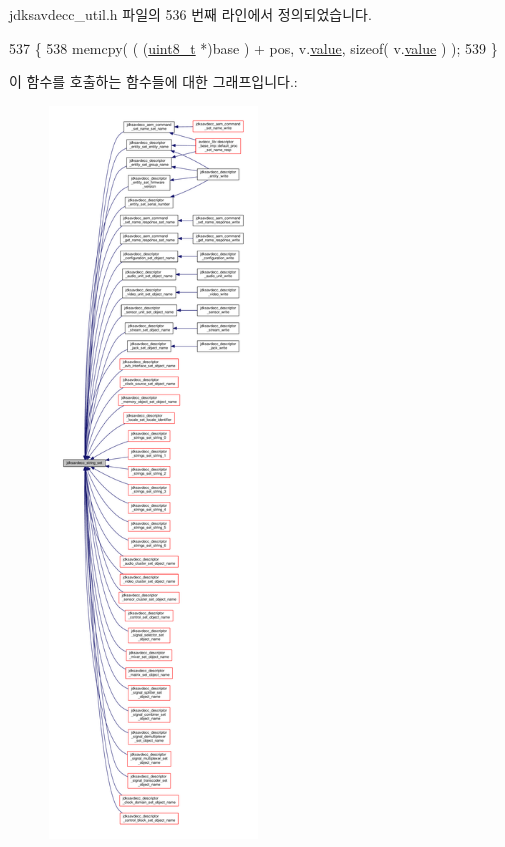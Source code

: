 jdksavdecc\+\_\+util.\+h 파일의 536 번째 라인에서 정의되었습니다.


\begin{DoxyCode}
537 \{
538     memcpy( ( (\hyperlink{stdint_8h_aba7bc1797add20fe3efdf37ced1182c5}{uint8\_t} *)base ) + pos, v.\hyperlink{structjdksavdecc__string_a7968db9d35aabae83b5c038723160e28}{value}, \textcolor{keyword}{sizeof}( v.\hyperlink{structjdksavdecc__string_a7968db9d35aabae83b5c038723160e28}{value} ) );
539 \}
\end{DoxyCode}


이 함수를 호출하는 함수들에 대한 그래프입니다.\+:
\nopagebreak
\begin{figure}[H]
\begin{center}
\leavevmode
\includegraphics[height=550pt]{group__string_gaffb2c926e982b532e0657e814afc0395_icgraph}
\end{center}
\end{figure}


